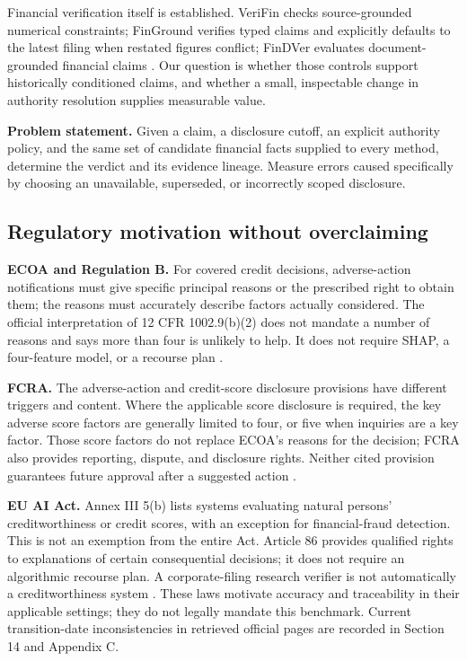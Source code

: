 \documentclass[11pt,a4paper]{article}
\newcommand{\lead}[1]{\textbf{\color{navy}#1}}
\begin{document}
Financial verification itself is established. VeriFin checks source-grounded numerical constraints; FinGround verifies typed claims and explicitly defaults to the latest filing when restated figures conflict; FinDVer evaluates document-grounded financial claims \cite{verifin,finground,findver}. Our question is whether those controls support historically conditioned claims, and whether a small, inspectable change in authority resolution supplies measurable value.

\begin{decisionbox}
\lead{Problem statement.} Given a claim, a disclosure cutoff, an explicit authority policy, and the same set of candidate financial facts supplied to every method, determine the verdict and its evidence lineage. Measure errors caused specifically by choosing an unavailable, superseded, or incorrectly scoped disclosure.
\end{decisionbox}

\subsection{Regulatory motivation without overclaiming}
\lead{ECOA and Regulation B.} For covered credit decisions, adverse-action notifications must give specific principal reasons or the prescribed right to obtain them; the reasons must accurately describe factors actually considered. The official interpretation of 12 CFR 1002.9(b)(2) does not mandate a number of reasons and says more than four is unlikely to help. It does not require SHAP, a four-feature model, or a recourse plan \cite{regb}.

\lead{FCRA.} The adverse-action and credit-score disclosure provisions have different triggers and content. Where the applicable score disclosure is required, the key adverse score factors are generally limited to four, or five when inquiries are a key factor. Those score factors do not replace ECOA's reasons for the decision; FCRA also provides reporting, dispute, and disclosure rights. Neither cited provision guarantees future approval after a suggested action \cite{fcra,regb}.

\lead{EU AI Act.} Annex III 5(b) lists systems evaluating natural persons' creditworthiness or credit scores, with an exception for financial-fraud detection. This is not an exemption from the entire Act. Article 86 provides qualified rights to explanations of certain consequential decisions; it does not require an algorithmic recourse plan. A corporate-filing research verifier is not automatically a creditworthiness system \cite{aiact}. These laws motivate accuracy and traceability in their applicable settings; they do not legally mandate this benchmark. Current transition-date inconsistencies in retrieved official pages are recorded in Section 14 and Appendix C.
\end{document}
